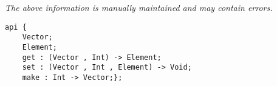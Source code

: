 \label{api:Unsafe\_Typelocked\_Vector}

{\tiny \it The above information is manually maintained and may contain errors.}
\begin{verbatim}
api {
    Vector;
    Element;
    get : (Vector , Int) -> Element;
    set : (Vector , Int , Element) -> Void;
    make : Int -> Vector;};
\end{verbatim}
